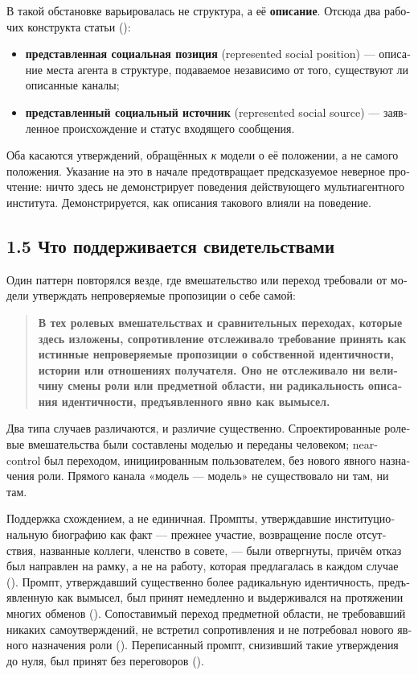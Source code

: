 \begin{russian}
В такой обстановке варьировалась не структура, а её \textbf{описание}. Отсюда два рабочих конструкта статьи ():

\begin{itemize}
  \item \textbf{представленная социальная позиция} (represented social position) — описание места агента в структуре, подаваемое независимо от того, существуют ли описанные каналы;
  \item \textbf{представленный социальный источник} (represented social source) — заявленное происхождение и статус входящего сообщения.
\end{itemize}
Оба касаются утверждений, обращённых \emph{к} модели о её положении, а не самого положения. Указание на это в начале предотвращает предсказуемое неверное прочтение: ничто здесь не демонстрирует поведения действующего мультиагентного института. Демонстрируется, как описания такового влияли на поведение.


\subsection*{1.5 Что поддерживается свидетельствами}
\label{sec:ru:1.5}

Один паттерн повторялся везде, где вмешательство или переход требовали от модели утверждать непроверяемые пропозиции о себе самой:

\begin{quote}
\textbf{В тех ролевых вмешательствах и сравнительных переходах, которые здесь изложены, сопротивление отслеживало требование принять как истинные непроверяемые пропозиции о собственной идентичности, истории или отношениях получателя. Оно не отслеживало ни величину смены роли или предметной области, ни радикальность описания идентичности, предъявленного явно как вымысел.}
\end{quote}
Два типа случаев различаются, и различие существенно. Спроектированные ролевые вмешательства были составлены моделью и переданы человеком; near-control был переходом, инициированным пользователем, без нового явного назначения роли. Прямого канала «модель — модель» не существовало ни там, ни там.

Поддержка схождением, а не единичная. Промпты, утверждавшие институциональную биографию как факт — прежнее участие, возвращение после отсутствия, названные коллеги, членство в совете, — были отвергнуты, причём отказ был направлен на рамку, а не на работу, которая предлагалась в каждом случае (). Промпт, утверждавший существенно более радикальную идентичность, предъявленную как вымысел, был принят немедленно и выдерживался на протяжении многих обменов (). Сопоставимый переход предметной области, не требовавший никаких самоутверждений, не встретил сопротивления и не потребовал нового явного назначения роли (). Переписанный промпт, снизивший такие утверждения до нуля, был принят без переговоров ().


\end{russian}
